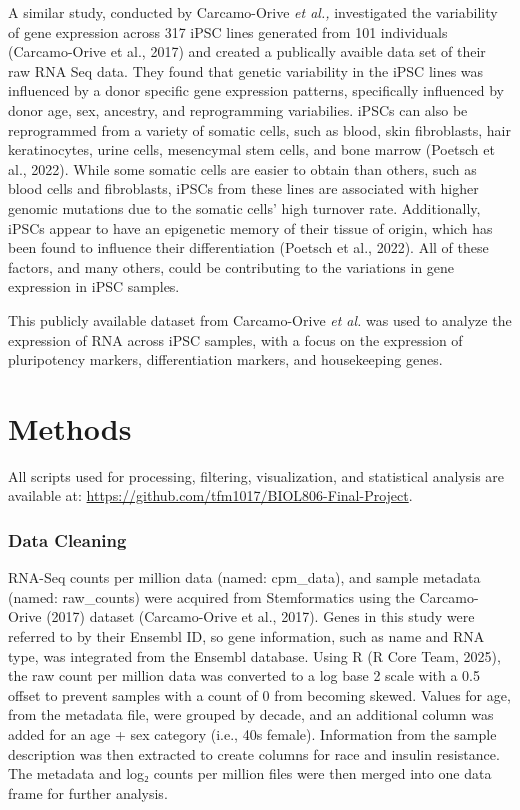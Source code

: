 \documentclass[
  letterpaper,
  DIV=11,
  numbers=noendperiod]{scrartcl}
\begin{document}
A similar study, conducted by Carcamo-Orive \emph{et al.,} investigated
the variability of gene expression across 317 iPSC lines generated from
101 individuals (Carcamo-Orive et al., 2017) and created a publically
avaible data set of their raw RNA Seq data. They found that genetic
variability in the iPSC lines was influenced by a donor specific gene
expression patterns, specifically influenced by donor age, sex,
ancestry, and reprogramming variabilies. iPSCs can also be reprogrammed
from a variety of somatic cells, such as blood, skin fibroblasts, hair
keratinocytes, urine cells, mesencymal stem cells, and bone marrow
(Poetsch et al., 2022). While some somatic cells are easier to obtain
than others, such as blood cells and fibroblasts, iPSCs from these lines
are associated with higher genomic mutations due to the somatic cells'
high turnover rate. Additionally, iPSCs appear to have an epigenetic
memory of their tissue of origin, which has been found to influence
their differentiation (Poetsch et al., 2022). All of these factors, and
many others, could be contributing to the variations in gene expression
in iPSC samples.

This publicly available dataset from Carcamo-Orive \emph{et al.} was
used to analyze the expression of RNA across iPSC samples, with a focus
on the expression of pluripotency markers, differentiation markers, and
housekeeping genes.

\section{Methods}\label{methods}

All scripts used for processing, filtering, visualization, and
statistical analysis are available at:
\url{https://github.com/tfm1017/BIOL806-Final-Project}.

\subsubsection{Data Cleaning}\label{data-cleaning}

RNA-Seq counts per million data (named: cpm\_data), and sample metadata
(named: raw\_counts) were acquired from Stemformatics using the
Carcamo-Orive (2017) dataset (Carcamo-Orive et al., 2017). Genes in this
study were referred to by their Ensembl ID, so gene information, such as
name and RNA type, was integrated from the Ensembl database. Using R (R
Core Team, 2025), the raw count per million data was converted to a log
base 2 scale with a 0.5 offset to prevent samples with a count of 0 from
becoming skewed. Values for age, from the metadata file, were grouped by
decade, and an additional column was added for an age + sex category
(i.e., 40s female). Information from the sample description was then
extracted to create columns for race and insulin resistance. The
metadata and log₂ counts per million files were then merged into one
data frame for further analysis.
\end{document}
